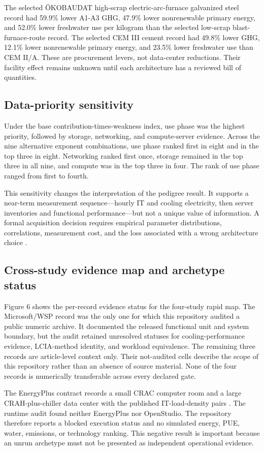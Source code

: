 \documentclass[review,12pt]{elsarticle}
\begin{document}
The selected ÖKOBAUDAT high-scrap electric-arc-furnace galvanized steel record had 59.9\% lower A1-A3 GHG, 47.9\% lower nonrenewable primary energy, and 52.0\% lower freshwater use per kilogram than the selected low-scrap blast-furnace-route record. The selected CEM III cement record had 49.8\% lower GHG, 12.1\% lower nonrenewable primary energy, and 23.5\% lower freshwater use than CEM II/A. These are procurement levers, not data-center reductions. Their facility effect remains unknown until each architecture has a reviewed bill of quantities.

\subsection{Data-priority sensitivity}
Under the base contribution-times-weakness index, use phase was the highest priority, followed by storage, networking, and compute-server evidence. Across the nine alternative exponent combinations, use phase ranked first in eight and in the top three in eight. Networking ranked first once, storage remained in the top three in all nine, and compute was in the top three in four. The rank of use phase ranged from first to fourth.

This sensitivity changes the interpretation of the pedigree result. It supports a near-term measurement sequence---hourly IT and cooling electricity, then server inventories and functional performance---but not a unique value of information. A formal acquisition decision requires empirical parameter distributions, correlations, measurement cost, and the loss associated with a wrong architecture choice \cite{ref34}.

\subsection{Cross-study evidence map and archetype status}
Figure 6 shows the per-record evidence status for the four-study rapid map. The Microsoft/WSP record was the only one for which this repository audited a public numeric archive. It documented the released functional unit and system boundary, but the audit retained unresolved statuses for cooling-performance evidence, LCIA-method identity, and workload equivalence. The remaining three records are article-level context only. Their not-audited cells describe the scope of this repository rather than an absence of source material. None of the four records is numerically transferable across every declared gate.

The EnergyPlus contract records a small CRAC computer room and a large CRAH-plus-chiller data center with the published IT-load-density pairs \cite{ref49}. The runtime audit found neither EnergyPlus nor OpenStudio. The repository therefore reports a blocked execution status and no simulated energy, PUE, water, emissions, or technology ranking. This negative result is important because an unrun archetype must not be presented as independent operational evidence.
\end{document}
